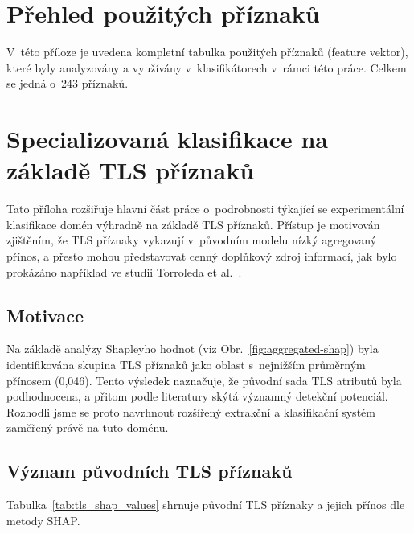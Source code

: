\chapter{Přehled použitých příznaků}

\label{app:feature_vector}

V~této příloze je uvedena kompletní tabulka použitých příznaků (feature vektor), které byly analyzovány a využívány v~klasifikátorech v~rámci této práce. Celkem se jedná o~243 příznaků. 







\chapter{Specializovaná klasifikace na základě TLS příznaků}
\label{appendix:tls-classification}

Tato příloha rozšiřuje hlavní část práce o~podrobnosti týkající se experimentální klasifikace domén výhradně na základě TLS příznaků. Přístup je motivován zjištěním, že TLS příznaky vykazují v~původním modelu nízký agregovaný přínos, a přesto mohou představovat cenný doplňkový zdroj informací, jak bylo prokázáno například ve studii Torroleda et al.~\cite{torroledo2018hunting}.

\section*{Motivace}
Na základě analýzy Shapleyho hodnot (viz Obr.~\ref{fig:aggregated-shap}) byla identifikována skupina TLS příznaků jako oblast s~nejnižším průměrným přínosem (0{,}046). Tento výsledek naznačuje, že původní sada TLS atributů byla podhodnocena, a přitom podle literatury skýtá významný detekční potenciál. Rozhodli jsme se proto navrhnout rozšířený extrakční a klasifikační systém zaměřený právě na tuto doménu.

\section*{Význam původních TLS příznaků}

Tabulka~\ref{tab:tls_shap_values} shrnuje původní TLS příznaky a jejich přínos dle metody SHAP.

